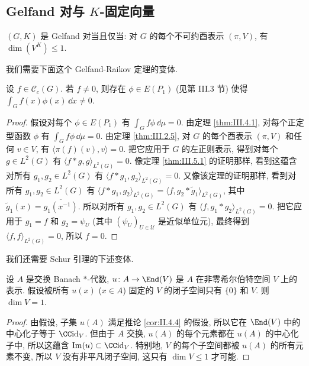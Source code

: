 \subsection{\texorpdfstring{Gelfand 对与 $K$-固定向量}{Gelfand 对与 K-固定向量}}

\begin{theorem}[$K$-固定向量判据]
\label{thm:V.3.1.1}
$(G, K)$ 是 Gelfand 对当且仅当: 对 $G$ 的每个不可约酉表示 $(\pi, V)$, 有 $\dim(V^K) \leq 1$.
\end{theorem}

我们需要下面这个 Gelfand-Raikov 定理的变体.

\begin{lemma}[积分分离]
\label{lem:V.3.1.2}
设 $f \in \mathcal{C}_c(G)$. 若 $f \neq 0$, 则存在 $\phi \in E(P_1)$ (见第 III.3 节) 使得 $\int_G f(x)\phi(x)\,\dd x \neq 0$.
\end{lemma}

\begin{proof}
假设对每个 $\phi \in E(P_1)$ 有 $\int_G f\phi\,\dd\mu = 0$. 由定理 \ref{thm:III.4.1}, 对每个正定型函数 $\phi$ 有 $\int_G f\phi\,\dd\mu = 0$. 由定理 \ref{thm:III.2.5}, 对 $G$ 的每个酉表示 $(\pi, V)$ 和任何 $v \in V$, 有 $\langle \pi(f)(v), v \rangle = 0$. 把它应用于 $G$ 的左正则表示, 得到对每个 $g \in L^2(G)$ 有 $\langle f * g, g \rangle_{L^2(G)} = 0$. 像定理 \ref{thm:III.5.1} 的证明那样, 看到这蕴含对所有 $g_1, g_2 \in L^2(G)$ 有 $\langle f * g_1, g_2 \rangle_{L^2(G)} = 0$. 又像该定理的证明那样, 看到对所有 $g_1, g_2 \in L^2(G)$ 有 $\langle f * g_1, g_2 \rangle_{L^2(G)} = \langle f, g_2 * \tilde{g}_1 \rangle_{L^2(G)}$, 其中 $\tilde{g}_1(x) = \overline{g_1(x^{-1})}$. 所以对所有 $g_1, g_2 \in L^2(G)$ 有 $\langle f, g_1 * g_2 \rangle_{L^2(G)} = 0$. 把它应用于 $g_1 = f$ 和 $g_2 = \psi_U$ (其中 $(\psi_U)_{U \in \mathcal{U}}$ 是近似单位元), 最终得到 $\langle f, f \rangle_{L^2(G)} = 0$, 所以 $f = 0$.
\end{proof}

我们还需要 Schur 引理的下述变体.

\begin{lemma}[交换代数的表示]
\label{lem:V.3.1.3}
设 $A$ 是交换 Banach $*$-代数, $u \colon A \to \End(V)$ 是 $A$ 在非零希尔伯特空间 $V$ 上的表示. 假设被所有 $u(x)$ ($x \in A$) 固定的 $V$ 的闭子空间只有 $\{0\}$ 和 $V$. 则 $\dim V = 1$.
\end{lemma}

\begin{proof}
由假设, 子集 $u(A)$ 满足推论 \ref{cor:II.4.4} 的假设, 所以它在 $\End(V)$ 中的中心化子等于 $\CC\mathrm{id}_V$. 但由于 $A$ 交换, $u(A)$ 的每个元素都在 $u(A)$ 的中心化子中, 所以这蕴含 $\Im(u) \subset \CC\mathrm{id}_V$. 特别地, $V$ 的每个子空间都被 $u(A)$ 的所有元素不变, 所以 $V$ 没有非平凡闭子空间, 这只有 $\dim V \leq 1$ 才可能.
\end{proof}

